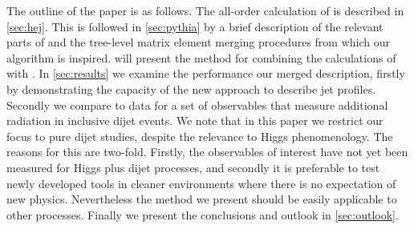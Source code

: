 The outline of the paper is as follows. The all-order calculation of \HEJ is
described in \cref{sec:hej}. This is followed in \cref{sec:pythia} by a brief description of the
relevant parts of \py and the tree-level matrix element merging procedures from which our algorithm is inspired.
 will present the method for combining the calculations of \py with \HEJ.
In \cref{sec:results} we examine the performance our merged description, firstly by 
demonstrating the capacity of the new approach to describe jet profiles.
Secondly we compare to data for a set of observables that measure additional radiation in inclusive dijet events. 
We note that in this paper we restrict our focus to pure dijet studies, despite the relevance to Higgs phenomenology.
The reasons for this are two-fold. Firstly, the observables of interest have not yet been measured for Higgs plus dijet processes,
and secondly it is preferable to test newly developed tools in cleaner environments where there is no expectation of new physics.
Nevertheless the method we present should be easily applicable to other processes.
Finally we present the conclusions and outlook in \cref{sec:outlook}.


